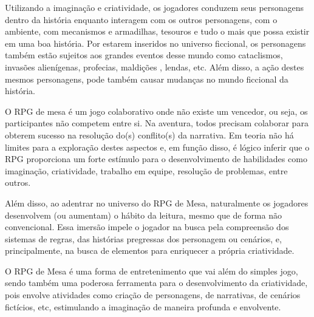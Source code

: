 Utilizando a imaginação e criatividade, os jogadores conduzem seus personagens dentro da história enquanto interagem com os outros personagens, com o ambiente, com mecanismos e armadilhas, tesouros e tudo o mais que possa existir em uma boa história. Por estarem inseridos no universo ficcional, os personagens também estão sujeitos aos grandes eventos desse mundo como cataclismos, invasões alienígenas, profecias, maldições , lendas, etc. Além disso, a ação destes mesmos personagens, pode também causar mudanças no mundo ficcional da história. 

O RPG de mesa é um jogo colaborativo onde não existe um vencedor, ou seja, os participantes não competem entre si. Na aventura, todos precisam colaborar para obterem sucesso na resolução do(s) conflito(s) da narrativa. Em teoria não há limites para a exploração destes aspectos e, em função disso, é lógico inferir que o RPG proporciona um forte estímulo para o desenvolvimento de habilidades como imaginação, criatividade, trabalho em equipe, resolução de problemas, entre outros.

Além disso, ao adentrar no universo do RPG de Mesa, naturalmente os jogadores desenvolvem (ou aumentam) o hábito da leitura, mesmo que de forma não convencional. Essa imersão impele o jogador na busca pela compreensão dos sistemas de regras, das histórias pregressas dos personagem ou cenários, e, principalmente, na busca de elementos para enriquecer a própria criatividade.

O RPG de Mesa é uma forma de entretenimento que vai além do simples jogo, sendo também uma poderosa ferramenta para o desenvolvimento da criatividade, pois envolve atividades como criação de personagens, de narrativas, de cenários fictícios, etc, estimulando a imaginação de maneira profunda e envolvente.


